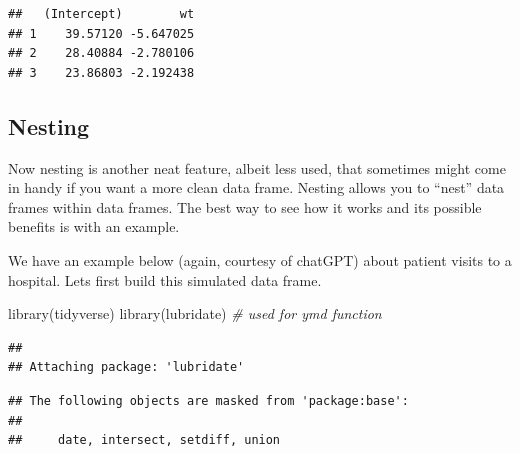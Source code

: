 \documentclass[
]{book}
\newenvironment{Shaded}{\begin{snugshade}}{\end{snugshade}}
\newcommand{\AttributeTok}[1]{\textcolor[rgb]{0.77,0.63,0.00}{#1}}
\newcommand{\CommentTok}[1]{\textcolor[rgb]{0.56,0.35,0.01}{\textit{#1}}}
\newcommand{\FunctionTok}[1]{\textcolor[rgb]{0.00,0.00,0.00}{#1}}
\newcommand{\NormalTok}[1]{#1}
\newcommand{\SpecialCharTok}[1]{\textcolor[rgb]{0.00,0.00,0.00}{#1}}
\begin{document}
\begin{Shaded}
\end{Shaded}

\begin{verbatim}
##   (Intercept)        wt
## 1    39.57120 -5.647025
## 2    28.40884 -2.780106
## 3    23.86803 -2.192438
\end{verbatim}

\hypertarget{nesting}{%
\subsection{Nesting}\label{nesting}}

Now nesting is another neat feature, albeit less used, that sometimes might come in handy if you want a more clean data frame. Nesting allows you to ``nest'' data frames within data frames. The best way to see how it works and its possible benefits is with an example.

We have an example below (again, courtesy of chatGPT) about patient visits to a hospital.
Lets first build this simulated data frame.

\begin{Shaded}
\begin{Highlighting}[]
\FunctionTok{library}\NormalTok{(tidyverse)}
\FunctionTok{library}\NormalTok{(lubridate)  }\CommentTok{\# used for ymd function}
\end{Highlighting}
\end{Shaded}

\begin{verbatim}
## 
## Attaching package: 'lubridate'
\end{verbatim}

\begin{verbatim}
## The following objects are masked from 'package:base':
## 
##     date, intersect, setdiff, union
\end{verbatim}
\end{document}
